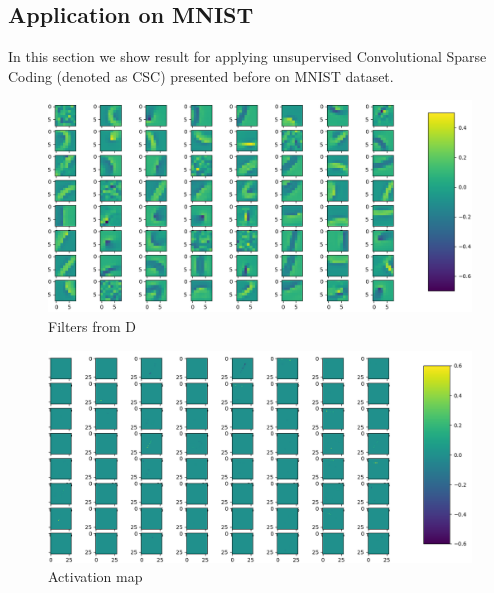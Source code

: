 
\subsection{Application on MNIST}
In this section we show result for applying unsupervised Convolutional Sparse Coding (denoted as CSC) presented before on MNIST dataset.
\begin{figure}[h]
 \centering
 \includegraphics[scale=0.6]{../Results/SPORCO_MNIST/D.png}
 \caption{Filters from D}
\end{figure}
\begin{figure}[h]
 \centering
 \includegraphics[scale=0.6]{../Results/SPORCO_MNIST/activation.png}
 \caption{Activation map}
\end{figure}



